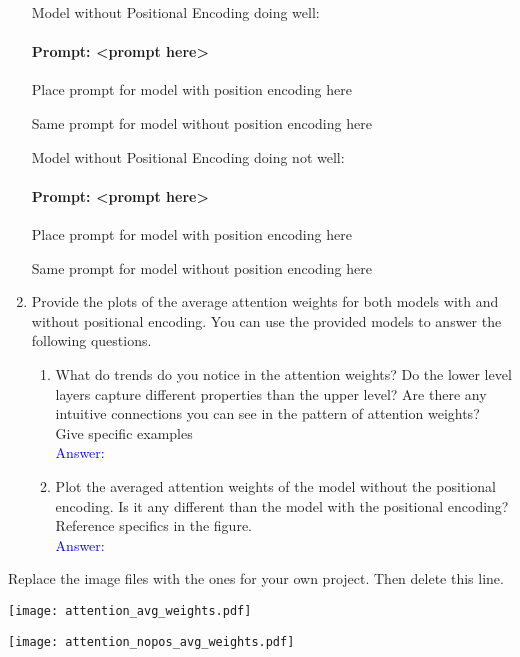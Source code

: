 \documentclass{article}
\begin{document}
\begin{enumerate}
Model without Positional Encoding doing well:
\paragraph{Prompt: <prompt here>}
\begin{displayquote}
Place prompt for model with position encoding  here
\end{displayquote}

\begin{displayquote}
Same prompt for model without position encoding here
\end{displayquote}

Model without Positional Encoding doing not well:
\paragraph{Prompt: <prompt here>}
\begin{displayquote}
Place prompt for model with position encoding  here
\end{displayquote}

\begin{displayquote}
Same prompt for model without position encoding here
\end{displayquote}

\item Provide the plots of the average attention weights for both models with and without positional encoding. You can use the provided models to answer the following questions. 
\begin{enumerate}
    \item What do trends do you notice in the attention weights? Do the lower level layers capture different properties than the upper level? Are there any intuitive connections you can see in the pattern of attention weights? Give specific examples
    \\
    
    \textcolor{blue}{Answer: 
    \\}

    
    \item Plot the averaged attention weights of the model without the positional encoding. Is it any different than the model with the positional encoding? Reference specifics in the figure. 
    \\
    
    \textcolor{blue}{Answer: 
    \\}
\end{enumerate}
\end{enumerate}

Replace the image files with the ones for your own project. Then delete this line. 

\texttt{[image: attention\_avg\_weights.pdf]}

\texttt{[image: attention\_nopos\_avg\_weights.pdf]}
\end{document}

